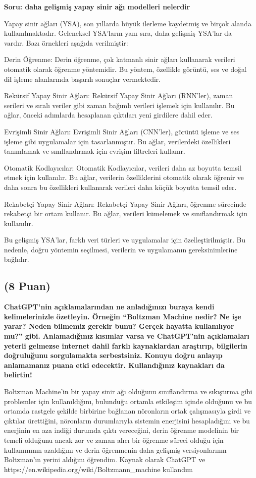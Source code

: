 \documentclass[11pt]{article}
\begin{document}
\textbf{Soru: daha gelişmiş yapay sinir ağı modelleri nelerdir}

Yapay sinir ağları (YSA), son yıllarda büyük ilerleme kaydetmiş ve birçok alanda kullanılmaktadır. Geleneksel YSA'ların yanı sıra, daha gelişmiş YSA'lar da vardır. Bazı örnekleri aşağıda verilmiştir:

Derin Öğrenme: Derin öğrenme, çok katmanlı sinir ağları kullanarak verileri otomatik olarak öğrenme yöntemidir. Bu yöntem, özellikle görüntü, ses ve doğal dil işleme alanlarında başarılı sonuçlar vermektedir.

Rekürsif Yapay Sinir Ağları: Rekürsif Yapay Sinir Ağları (RNN'ler), zaman serileri ve sıralı veriler gibi zaman bağımlı verileri işlemek için kullanılır. Bu ağlar, önceki adımlarda hesaplanan çıktıları yeni girdilere dahil eder.

Evrişimli Sinir Ağları: Evrişimli Sinir Ağları (CNN'ler), görüntü işleme ve ses işleme gibi uygulamalar için tasarlanmıştır. Bu ağlar, verilerdeki özellikleri tanımlamak ve sınıflandırmak için evrişim filtreleri kullanır.

Otomatik Kodlayıcılar: Otomatik Kodlayıcılar, verileri daha az boyutta temsil etmek için kullanılır. Bu ağlar, verilerin özelliklerini otomatik olarak öğrenir ve daha sonra bu özellikleri kullanarak verileri daha küçük boyutta temsil eder.

Rekabetçi Yapay Sinir Ağları: Rekabetçi Yapay Sinir Ağları, öğrenme sürecinde rekabetçi bir ortam kullanır. Bu ağlar, verileri kümelemek ve sınıflandırmak için kullanılır.

Bu gelişmiş YSA'lar, farklı veri türleri ve uygulamalar için özelleştirilmiştir. Bu nedenle, doğru yöntemin seçilmesi, verilerin ve uygulamanın gereksinimlerine bağlıdır.

\subsection{(8 Puan)} \textbf{ChatGPT’nin açıklamalarından ne anladığınızı buraya kendi kelimelerinizle özetleyin. Örneğin ``Boltzman Machine nedir? Ne işe yarar? Neden bilmemiz gerekir bunu? Gerçek hayatta kullanılıyor mu?'' gibi. Anlamadığınız kısımlar varsa ve ChatGPT’nin açıklamaları yeterli gelmezse internet dahil farklı kaynaklardan araştırıp, bilgilerin doğruluğunu sorgulamakta serbestsiniz. Konuyu doğru anlayıp anlamamanız puana etki edecektir. Kullandığınız kaynakları da belirtin!}

Boltzman Machine'in bir yapay sinir ağı olduğunu sınıflandırma ve sıkıştırma gibi problemler için kullanıldığını, bulunduğu ortamla etkileşim içinde olduğunu ve bu ortamda rastgele şekilde birbirine bağlanan nöronların ortak çalışmasıyla girdi ve çıktılar ürettiğini, nöronların durumlarıyla sistemin enerjisini hesapladığını ve bu enerjinin en aza indiği durumda çıktı vereceğini, derin öğrenme modelinin bir temeli olduğunu ancak zor ve zaman alıcı bir öğrenme süreci olduğu için kullanımının azaldığını ve derin öğrenmenin daha gelişmiş versiyonlarının Boltzman'ın yerini aldığını öğrendim. Kaynak olarak ChatGPT ve
https://en.wikipedia.org/wiki/Boltzmann\_machine
kullandım
\end{document}
